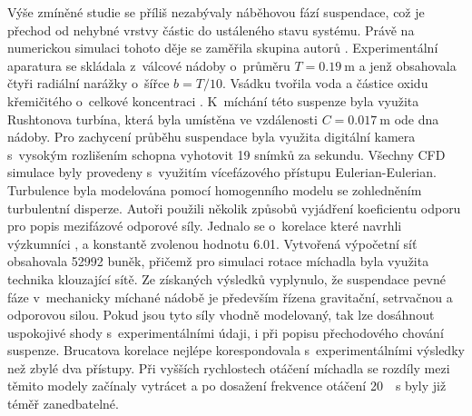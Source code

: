Výše zmíněné studie se příliš nezabývaly náběhovou fází suspendace, což je přechod od nehybné vrstvy částic do ustáleného stavu systému. Právě na numerickou simulaci tohoto děje se zaměřila skupina autorů \citet{tamb09}. Experimentální aparatura se skládala z~válcové nádoby o~průměru $T=\SI{0.19}{\meter}$ a jenž obsahovala čtyři radiální narážky o~šířce $b=T/10$. Vsádku tvořila voda a částice oxidu křemičitého o~celkové koncentraci . K~míchání této suspenze byla využita Rushtonova turbína, která byla umístěna ve vzdálenosti $C=\SI{0.017}{\meter}$ ode dna nádoby. Pro zachycení průběhu suspendace byla využita digitální kamera s~vysokým rozlišením schopna vyhotovit \num{19} snímků za sekundu. Všechny CFD simulace byly provedeny s~využitím vícefázového přístupu Eulerian-Eulerian. Turbulence byla modelována pomocí homogenního \keps{} modelu se zohledněním turbulentní disperze. Autoři použili několik způsobů vyjádření koeficientu odporu pro popis mezifázové odporové síly. Jednalo se o~korelace které navrhli výzkumníci \citet{cli78}, \citet{bru98} a konstantě zvolenou hodnotu \num{6.01}. Vytvořená výpočetní síť obsahovala \num{52992} buněk, přičemž pro simulaci rotace míchadla byla využita technika klouzající sítě. Ze získaných výsledků vyplynulo, že suspendace pevné fáze v~mechanicky míchané nádobě je především řízena gravitační, setrvačnou a odporovou silou. Pokud jsou tyto síly vhodně modelovaný, tak lze dosáhnout uspokojivé shody s~experimentálními údaji, i při popisu přechodového chování suspenze. Brucatova korelace nejlépe korespondovala s~experimentálními výsledky než zbylé dva přístupy. Při vyšších rychlostech otáčení míchadla se rozdíly mezi těmito modely začínaly vytrácet a po dosažení frekvence otáčení \SI{20}{\per\second} byly již téměř zanedbatelné.

